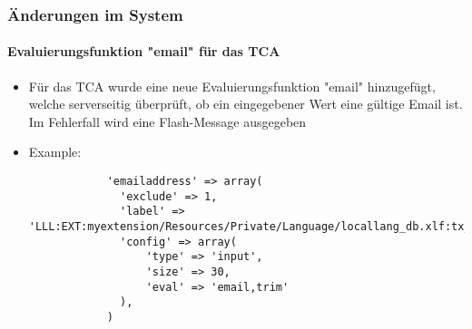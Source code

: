 \begin{frame}[fragile]
	\frametitle{Änderungen im System}
	\framesubtitle{Evaluierungsfunktion "email" für das TCA}

	\begin{itemize}
		\item Für das TCA wurde eine neue Evaluierungsfunktion "email" hinzugefügt,
			welche serverseitig überprüft, ob ein eingegebener Wert eine gültige
			Email ist. Im Fehlerfall wird eine Flash-Message ausgegeben

		\item Example:

		\begin{lstlisting}
			'emailaddress' => array(
			  'exclude' => 1,
			  'label' => 'LLL:EXT:myextension/Resources/Private/Language/locallang_db.xlf:tx_myextension
		 	  'config' => array(
			      'type' => 'input',
			      'size' => 30,
			      'eval' => 'email,trim'
			  ),
			)
		\end{lstlisting}
	\end{itemize}

\end{frame}


